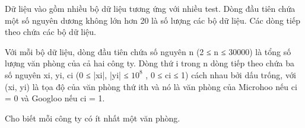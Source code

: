 Dữ liệu vào gồm nhiều bộ dữ liệu tương ứng với nhiều test. Dòng đầu tiên chứa một số nguyên dương không lớn hơn 20 là số lượng các bộ dữ liệu. Các dòng tiếp theo chứa các bộ dữ liệu.  

   Với mỗi bộ dữ liệu, dòng đầu tiên chứa số nguyên n (2 ≤ n ≤ 30000) là tổng số lượng văn phòng của cả hai công ty. Dòng thứ i trong n dòng tiếp theo chứa ba số nguyên xi, yi, ci (0 ≤ |xi|, |yi| ≤ $10^{8}$   , 0 ≤ ci ≤ 1) cách nhau bởi dấu trống, với (xi, yi) là tọa độ của văn phòng thứ ith và nó là văn phòng của Microhoo nếu ci = 0 và Googloo nếu ci = 1.  

   Cho biết mỗi công ty có ít nhất một văn phòng.